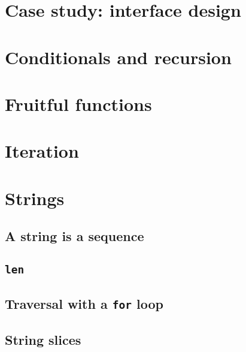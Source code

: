 \documentclass{article}
\begin{document}
\subsection{}
\subsection{}
\subsection{}
\subsection{}
\subsection{}



\section{Case study: interface design}
\section{Conditionals and recursion}
\section{Fruitful functions}
\section{Iteration}
\newpage%
\section{Strings}
\subsection{A string is a sequence}
\subsection{\texttt{len}}
\subsection{Traversal with a \texttt{for} loop}
\subsection{String slices}
\end{document}
